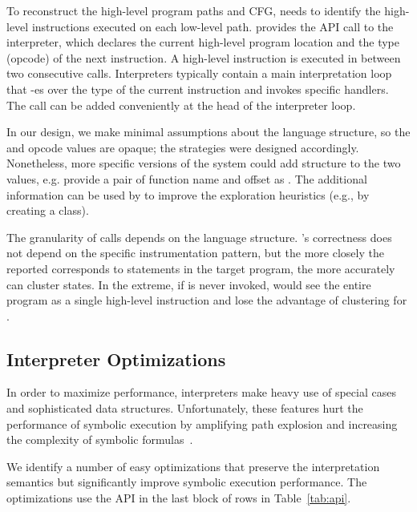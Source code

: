 To reconstruct the high-level program paths and CFG, \chef needs to identify the high-level instructions executed on each low-level path.  \chef provides the  API call to the interpreter, which declares the current high-level program location and the type (opcode) of the next instruction.  A high-level instruction is executed in between two consecutive  calls.
%
Interpreters typically contain a main interpretation loop that -es over the type of the current instruction and invokes specific handlers.  The  call can be added conveniently at the head of the interpreter loop.

In our design, we make minimal assumptions about the language structure, so the \hlpc and opcode values are opaque; the \cupa strategies were designed accordingly.  Nonetheless, more specific versions of the system could add structure to the two values, e.g. provide a pair of function name and offset as \hlpc.  The additional information can be used by \chef to improve the exploration heuristics (e.g., by creating a \cupa class).

The granularity of  calls depends on the language structure.  \chef's correctness does not depend on the specific instrumentation pattern, but the more closely the reported \hlpc corresponds to statements in the target program, the more accurately \cupa can cluster states. In the extreme, if  is never invoked, \chef would see the entire program as a single high-level instruction and lose the advantage of \cupa clustering for \hlpcs.


\subsection{Interpreter Optimizations}
\label{sec:chef:optimzeforsymbex}

In order to maximize performance, interpreters make heavy use of special cases and sophisticated data structures.  Unfortunately, these features hurt the performance of symbolic execution by amplifying path explosion and increasing the complexity of symbolic formulas~\cite{overify}.

We identify a number of easy optimizations that preserve the interpretation semantics but significantly improve symbolic execution performance.  The optimizations use the \chef API in the last block of rows in Table~\ref{tab:api}.

